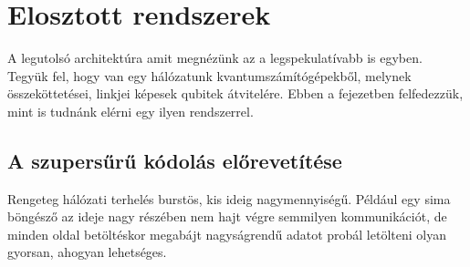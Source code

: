 \chapter{Elosztott rendszerek}\label{sect:distributed}
\hspace{2mm} A legutolsó architektúra amit megnézünk az a legspekulatívabb is egyben.
Tegyük fel, hogy van egy hálózatunk kvantumszámítógépekből, melynek összeköttetései, linkjei képesek qubitek átvitelére.
Ebben a fejezetben felfedezzük, mint is tudnánk elérni egy ilyen rendszerrel.
\section{A szupersűrű kódolás előrevetítése}
\hspace{2mm} Rengeteg hálózati terhelés burstös, kis ideig nagymennyiségű.
Például egy sima böngésző az ideje nagy részében nem hajt végre semmilyen kommunikációt, de minden oldal betöltéskor megabájt nagyságrendű adatot probál letölteni olyan gyorsan, ahogyan lehetséges.

